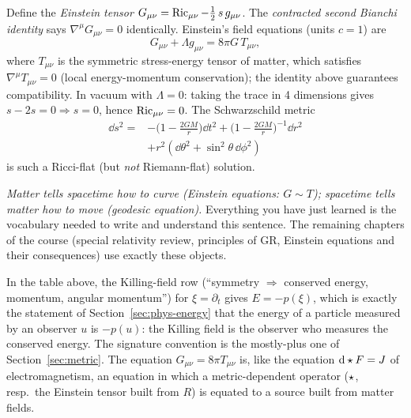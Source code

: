 \begin{formal}
Define the \emph{Einstein tensor} $G_{\mu\nu}=\operatorname{Ric}_{\mu\nu}-\tfrac12\,s\,g_{\mu\nu}$. The \emph{contracted second Bianchi identity} says $\nabla^\mu G_{\mu\nu}=0$ identically. Einstein's field equations (units $c=1$) are
\[
G_{\mu\nu}+\Lambda g_{\mu\nu}=8\pi G\,T_{\mu\nu},
\]
where $T_{\mu\nu}$ is the symmetric stress-energy tensor of matter, which satisfies $\nabla^\mu T_{\mu\nu}=0$ (local energy-momentum conservation); the identity above guarantees compatibility. In vacuum with $\Lambda=0$: taking the trace in 4 dimensions gives $s-2s=0\Rightarrow s=0$, hence $\operatorname{Ric}_{\mu\nu}=0$. The Schwarzschild metric
\[
\begin{aligned}\dd s^2={}&-\Big(1-\tfrac{2GM}{r}\Big)\dd t^2+\Big(1-\tfrac{2GM}{r}\Big)^{-1}\dd r^2\\&+r^2(\dd\theta^2+\sin^2\theta\,\dd\phi^2)\end{aligned}
\]
is such a Ricci-flat (but \emph{not} Riemann-flat) solution.
\end{formal}
\begin{intuition}
\emph{Matter tells spacetime how to curve (Einstein equations: $G\sim T$); spacetime tells matter how to move (geodesic equation).} Everything you have just learned is the vocabulary needed to write and understand this sentence. The remaining chapters of the course (special relativity review, principles of GR, Einstein equations and their consequences) use exactly these objects.
\end{intuition}


\begin{synthesis}
In the table above, the Killing-field row (``symmetry $\Rightarrow$ conserved energy, momentum, angular momentum'') for $\xi=\partial_t$ gives $E=-p(\xi)$, which is exactly the statement of Section~\ref{sec:phys-energy} that the energy of a particle measured by an observer $u$ is $-p(u)$: the Killing field is the observer who measures the conserved energy.
The signature convention is the mostly-plus one of Section~\ref{sec:metric}. The equation $G_{\mu\nu}=8\pi T_{\mu\nu}$ is, like the equation $\mathrm{d}\star F=J$ of electromagnetism, an equation in which a metric-dependent operator ($\star$, resp.\ the Einstein tensor built from $R$) is equated to a source built from matter fields.
\end{synthesis}
